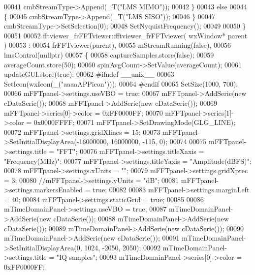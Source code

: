 \begin{DoxyCode}
00041         cmbStreamType->Append(\_T(\textcolor{stringliteral}{"LMS MIMO"}));
00042     \}
00043     \textcolor{keywordflow}{else}
00044     \{
00045         cmbStreamType->Append(\_T(\textcolor{stringliteral}{"LMS SISO"}));
00046     \}
00047     cmbStreamType->SetSelection(0);
00048     SetNyquistFrequency();
00049 
00050 \}
00051 
00052 fftviewer_frFFTviewer::fftviewer_frFFTviewer( wxWindow* parent )
00053 :
00054 frFFTviewer(parent),
00055 mStreamRunning(false),
00056 lmsControl(nullptr)
00057 \{
00058     captureSamples.store(\textcolor{keyword}{false});
00059     averageCount.store(50);
00060     spinAvgCount->SetValue(averageCount);
00061     updateGUI.store(\textcolor{keyword}{true});
00062 \textcolor{preprocessor}{#ifndef \_\_unix\_\_}
00063     SetIcon(wxIcon(\_(\textcolor{stringliteral}{"aaaaAPPicon"})));
00064 \textcolor{preprocessor}{#endif}
00065     SetSize(1000, 700);
00066     mFFTpanel->settings.useVBO = \textcolor{keyword}{true};
00067     mFFTpanel->AddSerie(\textcolor{keyword}{new} cDataSerie());
00068     mFFTpanel->AddSerie(\textcolor{keyword}{new} cDataSerie());
00069     mFFTpanel->series[0]->color = 0xFF0000FF;
00070     mFFTpanel->series[1]->color = 0x0000FFFF;
00071     mFFTpanel->SetDrawingMode(GLG_LINE);
00072     mFFTpanel->settings.gridXlines = 15;
00073     mFFTpanel->SetInitialDisplayArea(-16000000, 16000000, -115, 0);
00074 
00075     mFFTpanel->settings.title = \textcolor{stringliteral}{"FFT"};
00076     mFFTpanel->settings.titleXaxis = \textcolor{stringliteral}{"Frequency(MHz)"};
00077     mFFTpanel->settings.titleYaxis = \textcolor{stringliteral}{"Amplitude(dBFS)"};
00078     mFFTpanel->settings.xUnits = \textcolor{stringliteral}{""};
00079     mFFTpanel->settings.gridXprec = 3;
00080     \textcolor{comment}{//mFFTpanel->settings.yUnits = "dB";}
00081     mFFTpanel->settings.markersEnabled = \textcolor{keyword}{true};
00082 
00083     mFFTpanel->settings.marginLeft = 40;
00084     mFFTpanel->settings.staticGrid = \textcolor{keyword}{true};
00085 
00086     mTimeDomainPanel->settings.useVBO = \textcolor{keyword}{true};
00087     mTimeDomainPanel->AddSerie(\textcolor{keyword}{new} cDataSerie());
00088     mTimeDomainPanel->AddSerie(\textcolor{keyword}{new} cDataSerie());
00089     mTimeDomainPanel->AddSerie(\textcolor{keyword}{new} cDataSerie());
00090     mTimeDomainPanel->AddSerie(\textcolor{keyword}{new} cDataSerie());
00091     mTimeDomainPanel->SetInitialDisplayArea(0, 1024, -2050, 2050);
00092     mTimeDomainPanel->settings.title = \textcolor{stringliteral}{"IQ samples"};
00093     mTimeDomainPanel->series[0]->color = 0xFF0000FF;

\end{DoxyCode}
